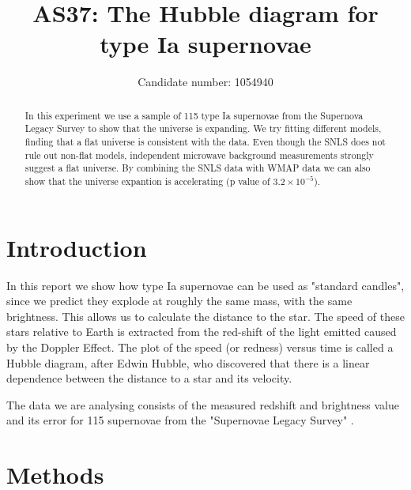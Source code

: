 \documentclass[11pt]{article}
\title{AS37: The Hubble diagram for type Ia supernovae}
\author{Candidate number: 1054940}
\begin{document}
\maketitle


\begin{abstract}
In this experiment we use a sample of 115 type Ia supernovae from the Supernova Legacy Survey to show that the universe is expanding. We try fitting different models, finding that a flat universe is consistent with the data. Even though the SNLS does not rule out non-flat models, independent microwave background measurements strongly suggest a flat universe. By combining the SNLS data with WMAP data we can also show that the universe expantion is accelerating (p value of $3.2 \times 10^{-5}$). 
\end{abstract}


\section{Introduction}
In this report we show how type Ia supernovae can be used as "standard candles", since we predict they explode at roughly the same mass, with the same brightness. This allows us to calculate the distance to the star. The speed of these stars relative to Earth is extracted from the red-shift of the light emitted caused by the Doppler Effect. The plot of the speed (or redness) versus time is called a Hubble diagram, after Edwin Hubble, who discovered that there is a linear dependence between the distance to a star and its velocity. 

The data we are analysing consists of the measured redshift and brightness value and its error for 115 supernovae from the "Supernovae Legacy Survey" \cite{SN_legacy_survey}. 


\section{Methods}
\end{document}
